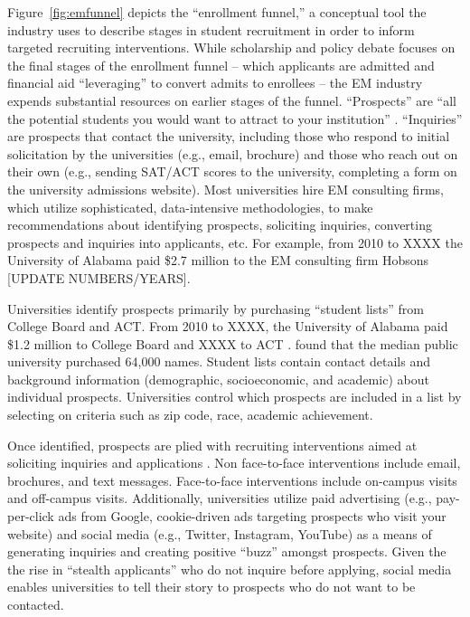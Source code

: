 \documentclass[twoside]{article}
\begin{document}
Figure~\ref{fig:emfunnel} depicts the ``enrollment funnel,'' a conceptual tool the industry uses to describe stages in student recruitment in order to inform targeted recruiting interventions.  While scholarship and policy debate focuses on the final stages of the enrollment funnel -- which applicants are admitted \citep[e.g., ][]{RN3536} and financial aid ``leveraging'' to convert admits to enrollees \citep[e.g., ][]{RN1948} -- the EM industry expends substantial resources on earlier stages of the funnel.  ``Prospects'' are ``all the potential students you would want to attract to your institution'' \citep{RN4322}. ``Inquiries'' are prospects that contact the university, including those who respond to initial solicitation by the universities (e.g., email, brochure) and those who reach out on their own (e.g., sending SAT/ACT scores to the university, completing a form on the university admissions website).  Most universities hire EM consulting firms, which utilize sophisticated, data-intensive methodologies, to make recommendations about identifying prospects, soliciting inquiries, converting prospects and inquiries into applicants, etc. For example, from 2010 to XXXX the University of Alabama paid \$2.7 million to the EM consulting firm Hobsons \citep{RN4035}[UPDATE NUMBERS/YEARS].



Universities identify prospects primarily by purchasing ``student lists'' from College Board and ACT. From 2010 to XXXX, the University of Alabama paid \$1.2 million to College Board and XXXX to ACT \citep{RN4035}.  \cite{RN4314} found that the median public university purchased 64,000 names. Student lists contain contact details and background information (demographic, socioeconomic, and academic) about individual prospects. Universities control which prospects are included in a list by selecting on criteria such as zip code, race, academic achievement.  

Once identified, prospects are plied with recruiting interventions aimed at soliciting inquiries and applications \citep{RN4323}. Non face-to-face interventions include email, brochures, and text messages.  Face-to-face interventions include on-campus visits and off-campus visits. Additionally, universities utilize paid advertising (e.g., pay-per-click ads from Google, cookie-driven ads targeting prospects who visit your website) and social media (e.g., Twitter, Instagram, YouTube) as a means of generating inquiries and creating positive ``buzz'' amongst prospects. Given the the rise in ``stealth applicants'' who do not inquire before applying, social media enables universities to tell their story to prospects who do not want to be contacted.
\end{document}
